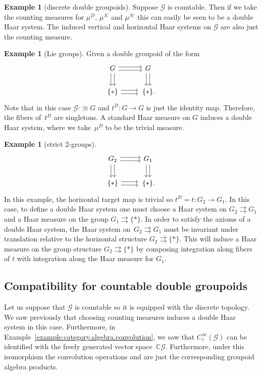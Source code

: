 \documentclass[pdftex]{sigma}
\numberwithin{equation}{section}
\theoremstyle{definition}
\newtheorem{Example}[Theorem]{Example}
\newcommand{\BBC}{\mathbb{C}}
\newcommand{\CG}{\mathcal{G}}
\newcommand{\CH}{\mathcal{H}}
\newcommand{\CK}{\mathcal{K}}
\newcommand{\stardot}{\overset{{\bullet}}{*}}
\newcommand{\starcirc}{\overset{\circ}{*}}
\newcommand{\darrow}{\arrow[d, shift right] \arrow[d, shift left]}
\newcommand{\rarrow}{\arrow[r, shift right] \arrow[r, shift left]}
\newcommand{\grpd}{\rightrightarrows}
\begin{document}
\begin{Example}[discrete double groupoids]
   Suppose $ \CG $ is countable. Then if we take the counting measures for $ \mu^D$, $ \mu^\CK$ and $ \mu^\CH $ this can easily be seen to be a double Haar system. The induced vertical and horizontal Haar systems on $ \CG $ are also just the counting measure.
\end{Example}
\begin{Example}[Lie groups]\label{example:Lie.groups}
Given a double groupoid of the form
  \[\begin{tikzcd}
G \darrow \rarrow & G \darrow \\
\{*\} \rarrow & \,\{*\}.
\end{tikzcd}
\]
Note that in this case $ \CG^\lrcorner \cong G $ and $ t^D \colon G \to G $ is just the identity map. Therefore, the fibers of~$ t^D $ are singletons. A standard Haar measure on $ G $ induces a double Haar system, where we take~$ \mu^D $ to be the trivial measure.
\end{Example}
\begin{Example}[strict 2-groups]
    \[\begin{tikzcd}
G_2 \darrow \rarrow & G_1 \darrow \\
\{*\} \rarrow & \,\{*\}.
\end{tikzcd}
\]
In this example, the horizontal target map is trivial so $ t^D = t \colon G_2 \to G_1 $. In this case, to define a double Haar system one must choose a Haar system on $ G_2 \grpd G_1 $ and a Haar measure on the group $ G_1 \grpd \{ * \} $. In order to satisfy the axioms of a double Haar system, the Haar system on~${ G_2 \grpd G_1}$ must be invariant under translation relative to the horizontal structure $ G_2 \grpd \{ * \} $. This will induce a Haar measure on the group structure $ G_2 \grpd \{ * \} $ by composing integration along fibers of $ t $ with integration along the Haar measure for $ G_1 $.
\end{Example}
\subsection{Compatibility for countable double groupoids}
Let us suppose that $ \CG $ is countable so it is equipped with the discrete topology. We saw previously that choosing counting measures induces a double Haar system in this case. Furthermore, in Example~\ref{example:category.algebra.convolution}, we saw that $ C_c^\infty(\CG) $ can be identified with the freely generated vector space~$ \BBC \CG $. Furthermore, under this isomorphism the convolution operations \smash{$ \stardot $} and \smash{$ \starcirc$} are just the corresponding groupoid algebra products.
\end{document}
